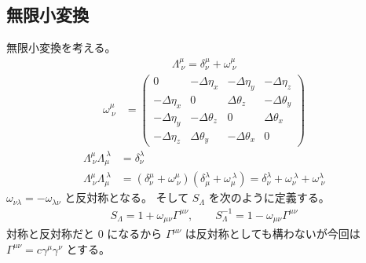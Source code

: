 \documentclass[uplatex,dvipdfmx,a4paper,11pt]{jlreq}
\numberwithin{equation}{section}
\theoremstyle{definition}
\begin{document}
\subsection{無限小変換}
無限小変換を考える。
\begin{align}
  \Lambda_{\ \nu}^\mu = \delta_\nu^\mu + \omega_{\ \nu}^\mu
\end{align}
\begin{align}
  \omega_{\ \nu}^\mu & = \begin{pmatrix}
                           0             & -\Delta\eta_x   & -\Delta\eta_y   & -\Delta\eta_z   \\
                           -\Delta\eta_x & 0               & \Delta\theta_z  & -\Delta\theta_y \\
                           -\Delta\eta_y & -\Delta\theta_z & 0               & \Delta\theta_x  \\
                           -\Delta\eta_z & \Delta\theta_y  & -\Delta\theta_x & 0
                         \end{pmatrix}
\end{align}
\begin{align}
  \Lambda_{\ \nu}^\mu\Lambda^{\ \lambda}_\mu & = \delta_\nu^\lambda                                                                                                                                        \\
  \Lambda_{\ \nu}^\mu\Lambda^{\ \lambda}_\mu & = (\delta_\nu^\mu + \omega_{\ \nu}^\mu)(\delta^\lambda_\mu + \omega^{\ \lambda}_\mu) = \delta^\lambda_\nu + \omega^{\ \lambda}_\nu + \omega_{\ \nu}^\lambda
\end{align}
$\omega_{\nu\lambda} = -\omega_{\lambda\nu}$ と反対称となる。
そして $S_\Lambda$ を次のように定義する。
\begin{align}
  S_\Lambda = 1 + \omega_{\mu\nu}\Gamma^{\mu\nu}, \qquad S_\Lambda^{-1} = 1 - \omega_{\mu\nu}\Gamma^{\mu\nu}
\end{align}
対称と反対称だと $0$ になるから $\Gamma^{\mu\nu}$ は反対称としても構わないが今回は $\Gamma^{\mu\nu} = c\gamma^\mu\gamma^\nu$ とする。
\end{document}
